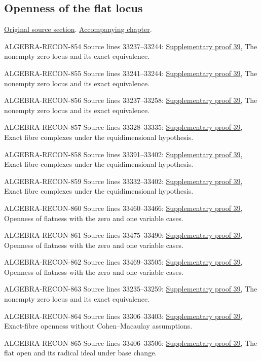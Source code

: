 \subsection{Openness of the flat locus}
\hypertarget{algebra-source-section-open-flat}{}
\noindent\href{https://github.com/stacks/stacks-project/blob/a04446e57ec1fbc252a871afcec7752fb2807b14/algebra.tex\#L33227}{Original source section}. \href{algebra.pdf\#nameddest=section-open-flat}{Accompanying chapter}.

\begin{AlgebraSourceRoutes}
\item[ALGEBRA-RECON-854] Source lines 33237--33244: \hyperlink{algebra_open_flat_notes_20260928}{Supplementary proof 39}, The nonempty zero locus and its exact equivalence.
\item[ALGEBRA-RECON-855] Source lines 33241--33244: \hyperlink{algebra_open_flat_notes_20260928}{Supplementary proof 39}, The nonempty zero locus and its exact equivalence.
\item[ALGEBRA-RECON-856] Source lines 33237--33258: \hyperlink{algebra_open_flat_notes_20260928}{Supplementary proof 39}, The nonempty zero locus and its exact equivalence.
\item[ALGEBRA-RECON-857] Source lines 33328--33335: \hyperlink{algebra_open_flat_notes_20260928}{Supplementary proof 39}, Exact fibre complexes under the equidimensional hypothesis.
\item[ALGEBRA-RECON-858] Source lines 33391--33402: \hyperlink{algebra_open_flat_notes_20260928}{Supplementary proof 39}, Exact fibre complexes under the equidimensional hypothesis.
\item[ALGEBRA-RECON-859] Source lines 33332--33402: \hyperlink{algebra_open_flat_notes_20260928}{Supplementary proof 39}, Exact fibre complexes under the equidimensional hypothesis.
\item[ALGEBRA-RECON-860] Source lines 33460--33466: \hyperlink{algebra_open_flat_notes_20260928}{Supplementary proof 39}, Openness of flatness with the zero and one variable cases.
\item[ALGEBRA-RECON-861] Source lines 33475--33490: \hyperlink{algebra_open_flat_notes_20260928}{Supplementary proof 39}, Openness of flatness with the zero and one variable cases.
\item[ALGEBRA-RECON-862] Source lines 33469--33505: \hyperlink{algebra_open_flat_notes_20260928}{Supplementary proof 39}, Openness of flatness with the zero and one variable cases.
\item[ALGEBRA-RECON-863] Source lines 33235--33259: \hyperlink{algebra_open_flat_notes_20260928}{Supplementary proof 39}, The nonempty zero locus and its exact equivalence.
\item[ALGEBRA-RECON-864] Source lines 33306--33403: \hyperlink{algebra_open_flat_notes_20260928}{Supplementary proof 39}, Exact-fibre openness without Cohen–Macaulay assumptions.
\item[ALGEBRA-RECON-865] Source lines 33406--33506: \hyperlink{algebra_open_flat_notes_20260928}{Supplementary proof 39}, The flat open and its radical ideal under base change.
\end{AlgebraSourceRoutes}

